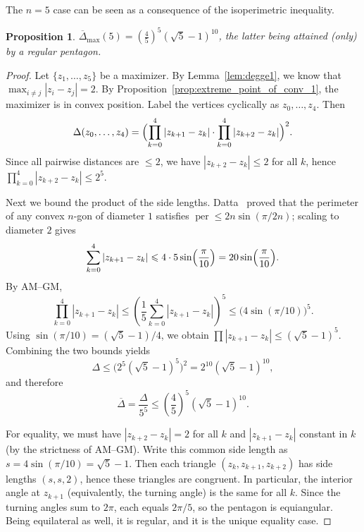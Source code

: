\documentclass{article}
\newtheorem{proposition}[thr]{Proposition}
\theoremstyle{definition}
\let\le\leqslant
\begin{document}
The \(n=5\) case can be seen as a consequence of the isoperimetric inequality.

\begin{proposition}
    \label{prop:n5}
    $\overline{\Delta}_\max (5) = (\frac45)^5(\sqrt 5 -1)^{10}$, the latter being attained (only) by a regular pentagon.
\end{proposition}

\begin{proof}
Let $\{z_1,\dots,z_5\}$ be a maximizer. By Lemma~\ref{lem:degge1}, we know that $\max_{i\ne j}|z_i-z_j|=2$. By Proposition~\ref{prop:extreme_point_of_conv_1}, the maximizer is in convex position.
Label the vertices cyclically as $z_0,\dots,z_4$. Then
\[
\Delta(z_0,\dots,z_4)=\Bigl(\prod_{k=0}^4 |z_{k+1}-z_k|\cdot \prod_{k=0}^4 |z_{k+2}-z_k|\Bigr)^2.
\]
Since all pairwise distances are $\le 2$, we have $|z_{k+2}-z_k|\le 2$ for all $k$, hence \(\prod_{k=0}^4 |z_{k+2}-z_k| \le 2^5\).

Next we bound the product of the side lengths. Datta~\cite{Datta1997ADI} proved that the perimeter of any convex
$n$-gon of diameter $1$ satisfies $\operatorname{per}\le 2n\sin(\pi/2n)$; scaling to diameter $2$ gives
\[
\sum_{k=0}^4 |z_{k+1}-z_k| \le 4\cdot 5\sin\Bigl(\frac{\pi}{10}\Bigr)=20\sin\Bigl(\frac{\pi}{10}\Bigr).
\]
By AM--GM,
\[
\prod_{k=0}^4 |z_{k+1}-z_k| \le \left(\frac{1}{5}\sum_{k=0}^4 |z_{k+1}-z_k|\right)^5
\le \bigl(4\sin(\pi/10)\bigr)^5.
\]
Using $\sin(\pi/10)=(\sqrt5-1)/4$, we obtain $\prod |z_{k+1}-z_k|\le (\sqrt5-1)^5$.
Combining the two bounds yields
\[
\Delta \le \bigl(2^5(\sqrt5-1)^5\bigr)^2 = 2^{10}(\sqrt5-1)^{10},
\]
and therefore
\[
\overline{\Delta}=\frac{\Delta}{5^5}\le \left(\frac45\right)^5(\sqrt5-1)^{10}.
\]

For equality, we must have $|z_{k+2}-z_k|=2$ for all $k$ and
$|z_{k+1}-z_k|$ constant in $k$ (by the strictness of AM--GM). Write this common side length as
$s=4\sin(\pi/10)=\sqrt5-1$.
Then each triangle $(z_k,z_{k+1},z_{k+2})$ has side lengths $(s,s,2)$, hence these triangles are congruent.
In particular, the interior angle at $z_{k+1}$ (equivalently, the turning angle) is the same for all $k$.
Since the turning angles sum to $2\pi$, each equals $2\pi/5$, so the pentagon is equiangular.
Being equilateral as well, it is regular, and it is the unique equality case.
\end{proof}
\end{document}

